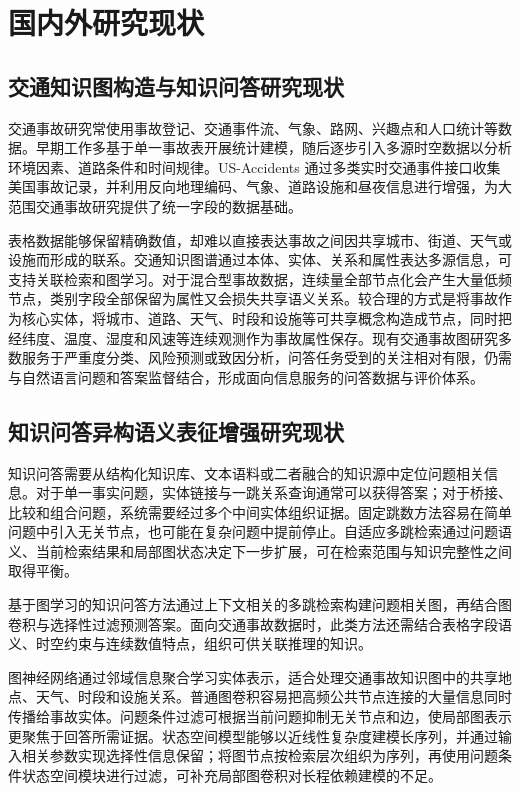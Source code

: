 \section{国内外研究现状}

\subsection{交通知识图构造与知识问答研究现状}

交通事故研究常使用事故登记、交通事件流、气象、路网、兴趣点和人口统计等数据。早期工作多基于单一事故表开展统计建模，随后逐步引入多源时空数据以分析环境因素、道路条件和时间规律。US-Accidents 通过多类实时交通事件接口收集美国事故记录，并利用反向地理编码、气象、道路设施和昼夜信息进行增强，为大范围交通事故研究提供了统一字段的数据基础。

表格数据能够保留精确数值，却难以直接表达事故之间因共享城市、街道、天气或设施而形成的联系。交通知识图谱通过本体、实体、关系和属性表达多源信息，可支持关联检索和图学习。对于混合型事故数据，连续量全部节点化会产生大量低频节点，类别字段全部保留为属性又会损失共享语义关系。较合理的方式是将事故作为核心实体，将城市、道路、天气、时段和设施等可共享概念构造成节点，同时把经纬度、温度、湿度和风速等连续观测作为事故属性保存。现有交通事故图研究多数服务于严重度分类、风险预测或致因分析，问答任务受到的关注相对有限，仍需与自然语言问题和答案监督结合，形成面向信息服务的问答数据与评价体系。

\subsection{知识问答异构语义表征增强研究现状}

知识问答需要从结构化知识库、文本语料或二者融合的知识源中定位问题相关信息。对于单一事实问题，实体链接与一跳关系查询通常可以获得答案；对于桥接、比较和组合问题，系统需要经过多个中间实体组织证据。固定跳数方法容易在简单问题中引入无关节点，也可能在复杂问题中提前停止。自适应多跳检索通过问题语义、当前检索结果和局部图状态决定下一步扩展，可在检索范围与知识完整性之间取得平衡。

基于图学习的知识问答方法通过上下文相关的多跳检索构建问题相关图，再结合图卷积与选择性过滤预测答案。面向交通事故数据时，此类方法还需结合表格字段语义、时空约束与连续数值特点，组织可供关联推理的知识。

图神经网络通过邻域信息聚合学习实体表示，适合处理交通事故知识图中的共享地点、天气、时段和设施关系。普通图卷积容易把高频公共节点连接的大量信息同时传播给事故实体。问题条件过滤可根据当前问题抑制无关节点和边，使局部图表示更聚焦于回答所需证据。状态空间模型能够以近线性复杂度建模长序列，并通过输入相关参数实现选择性信息保留；将图节点按检索层次组织为序列，再使用问题条件状态空间模块进行过滤，可补充局部图卷积对长程依赖建模的不足。


